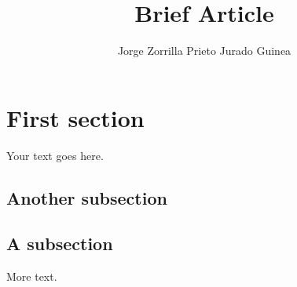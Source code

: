 \documentclass[11pt]{article} %
\title{Brief Article}
\author{Jorge Zorrilla Prieto Jurado Guinea}
\begin{document}
\maketitle

\section{First section}

Your text goes here.

\subsection{Another subsection}

\subsection{A subsection}

More text.
\end{document}
